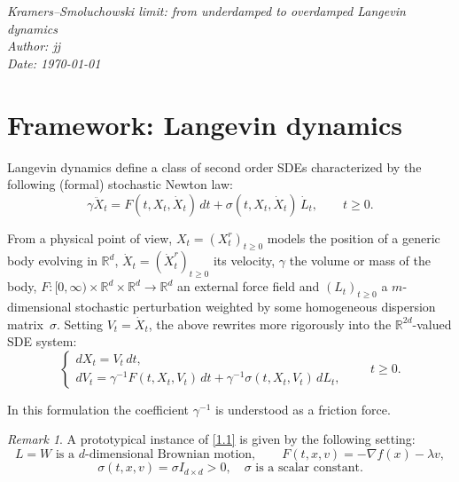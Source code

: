 \documentclass[11pt]{article}
\theoremstyle{remark}
\newtheorem{remark}{Remark}
\newcommand{\todayYYMMDD}{\the\year-\the\month-\the\day}
\begin{document}
\hfill
\begin{center}
\textit{Kramers--Smoluchowski limit: from underdamped to overdamped Langevin dynamics}\\
\textit{Author: jj}\\
\textit{Date: \today}
\end{center}
\section{Framework: Langevin dynamics}

Langevin dynamics define a class of second order SDEs characterized by the following (formal) stochastic Newton law:
\[
\gamma \ddot{X}_t = F(t,X_t,\dot{X}_t)\,dt + \sigma(t,X_t,\dot{X}_t)\,\dot{L}_t, \qquad t \ge 0.
\]

From a physical point of view, $X_t=(X_t^r)_{t\ge0}$ models the position of a generic body evolving in $\mathbb{R}^d$,
$\dot{X}_t=(\dot{X}_t^r)_{t\ge0}$ its velocity, $\gamma$ the volume or mass of the body,
$F:[0,\infty)\times\mathbb{R}^d\times\mathbb{R}^d\to\mathbb{R}^d$ an external force field
and $(L_t)_{t\ge0}$ a $m$-dimensional stochastic perturbation weighted by some homogeneous dispersion matrix~$\sigma$.
Setting $V_t=\dot{X}_t$, the above rewrites more rigorously into the $\mathbb{R}^{2d}$-valued SDE system:
\begin{equation}
\begin{cases}
dX_t = V_t\,dt,\\
dV_t = \gamma^{-1}F(t,X_t,V_t)\,dt + \gamma^{-1}\sigma(t,X_t,V_t)\,dL_t,
\end{cases}
\qquad t\ge0.
\tag{1.1}
\end{equation}

In this formulation the coefficient $\gamma^{-1}$ is understood as a friction force.

\begin{remark}
A prototypical instance of \eqref{1.1} is given by the following setting:
\[
L=W \text{ is a $d$-dimensional Brownian motion}, \qquad
F(t,x,v)=-\nabla f(x)-\lambda v,
\]
\[
\sigma(t,x,v)=\sigma I_{d\times d}>0, \quad \sigma \text{ is a scalar constant}.
\tag{1.2}
\]
\end{remark}
\end{document}

